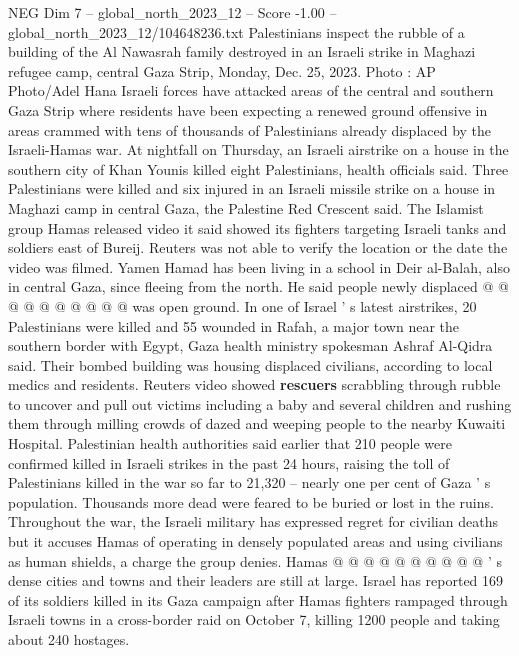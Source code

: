 \begin{textsample}{NEG Dim 7 – global\_north\_2023\_12 – Score -1.00 – global\_north\_2023\_12/104648236.txt}  \label{ex:f7_neg_307}
Palestinians inspect the rubble of a building of the Al Nawasrah family destroyed in an Israeli strike in Maghazi refugee camp, central Gaza Strip, Monday, Dec. 25, 2023.
Photo : AP Photo/Adel Hana Israeli forces have attacked areas of the central and southern Gaza Strip where residents have been expecting a renewed ground offensive in areas crammed with tens of thousands of Palestinians already displaced by the Israeli-Hamas war.
At nightfall on Thursday, an Israeli airstrike on a house in the southern city of Khan Younis killed eight Palestinians, health officials said.
Three Palestinians were killed and six injured in an Israeli missile strike on a house in Maghazi camp in central Gaza, the Palestine Red Crescent said.
The Islamist group Hamas released video it said showed its fighters targeting Israeli tanks and soldiers east of Bureij.
Reuters was not able to verify the location or the date the video was filmed.
Yamen Hamad has been living in a school in Deir al-Balah, also in central Gaza, since fleeing from the north.
He said people newly displaced @ @ @ @ @ @ @ @ @ @ was open ground.
In one of Israel ' s latest airstrikes, 20 Palestinians were killed and 55 wounded in Rafah, a major town near the southern border with Egypt, Gaza health ministry spokesman Ashraf Al-Qidra said.
Their bombed building was housing displaced civilians, according to local medics and residents.
Reuters video showed \textbf{rescuers} scrabbling through rubble to uncover and pull out victims including a baby and several children and rushing them through milling crowds of dazed and weeping people to the nearby Kuwaiti Hospital.
Palestinian health authorities said earlier that 210 people were confirmed killed in Israeli strikes in the past 24 hours, raising the toll of Palestinians killed in the war so far to 21,320 -- nearly one per cent of Gaza ' s population.
Thousands more dead were feared to be buried or lost in the ruins.
Throughout the war, the Israeli military has expressed regret for civilian deaths but it accuses Hamas of operating in densely populated areas and using civilians as human shields, a charge the group denies.
Hamas @ @ @ @ @ @ @ @ @ @ ' s dense cities and towns and their leaders are still at large.
Israel has reported 169 of its soldiers killed in its Gaza campaign after Hamas fighters rampaged through Israeli towns in a cross-border raid on October 7, killing 1200 people and taking about 240 hostages.

\end{textsample}
